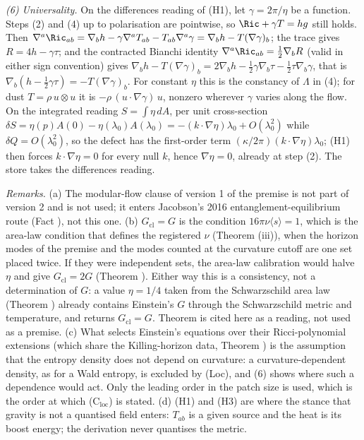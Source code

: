 \emph{(6) Universality.} On the differences reading of (H1), let $\gamma = 2\pi/\eta$ be a function. Steps (2) and (4) up to polarisation are pointwise, so $\Ric + \gamma T = h g$ still holds. Then $\nabla^{a}\Ric_{ab} = \nabla_{b}h - \gamma\nabla^{a}T_{ab} - T_{ab}\nabla^{a}\gamma = \nabla_{b}h - T(\nabla\gamma)_{b}$; the trace gives $R = 4h - \gamma\tau$; and the contracted Bianchi identity $\nabla^{a}\Ric_{ab} = \tfrac12\nabla_{b}R$ (valid in either sign convention) gives $\nabla_{b}h - T(\nabla\gamma)_{b} = 2\nabla_{b}h - \tfrac12\gamma\nabla_{b}\tau - \tfrac12\tau\nabla_{b}\gamma$, that is $\nabla_{b}(h - \tfrac12\gamma\tau) = -T(\nabla\gamma)_{b}$. For constant $\eta$ this is the constancy of $\Lambda$ in (4); for dust $T = \rho\,u\otimes u$ it is $-\rho\,(u\cdot\nabla\gamma)\,u$, nonzero wherever $\gamma$ varies along the flow. On the integrated reading $S = \int\eta\,dA$, per unit cross-section $\delta S = \eta(p)A(0) - \eta(\lambda_{0})A(\lambda_{0}) = -(k\cdot\nabla\eta)\lambda_{0} + O(\lambda_{0}^{2})$ while $\delta Q = O(\lambda_{0}^{2})$, so the defect has the first-order term $(\kappa/2\pi)(k\cdot\nabla\eta)\lambda_{0}$; (H1) then forces $k\cdot\nabla\eta = 0$ for every null $k$, hence $\nabla\eta = 0$, already at step (2). The store takes the differences reading.

\emph{Remarks.} (a) The modular-flow clause of version 1 of the premise is not part of version 2 and is not used; it enters Jacobson's 2016 entanglement-equilibrium route (Fact ), not this one. (b) $G_{\mathrm{cl}} = G$ is the condition $16\pi\nu\langle s\rangle = 1$, which is the area-law condition that defines the registered $\nu$ (Theorem (iii)), when the horizon modes of the premise and the modes counted at the curvature cutoff are one set placed twice. If they were independent sets, the area-law calibration would halve $\eta$ and give $G_{\mathrm{cl}} = 2G$ (Theorem ). Either way this is a consistency, not a determination of $G$: a value $\eta = 1/4$ taken from the Schwarzschild area law (Theorem ) already contains Einstein's $G$ through the Schwarzschild metric and temperature, and returns $G_{\mathrm{cl}} = G$. Theorem  is cited here as a reading, not used as a premise. (c) What selects Einstein's equations over their Ricci-polynomial extensions (which share the Killing-horizon data, Theorem ) is the assumption that the entropy density does not depend on curvature: a curvature-dependent density, as for a Wald entropy, is excluded by (Loc), and (6) shows where such a dependence would act. Only the leading order in the patch size is used, which is the order at which (C$_{\mathrm{loc}}$) is stated. (d) (H1) and (H3) are where the stance that gravity is not a quantised field enters: $T_{ab}$ is a given source and the heat is its boost energy; the derivation never quantises the metric.

